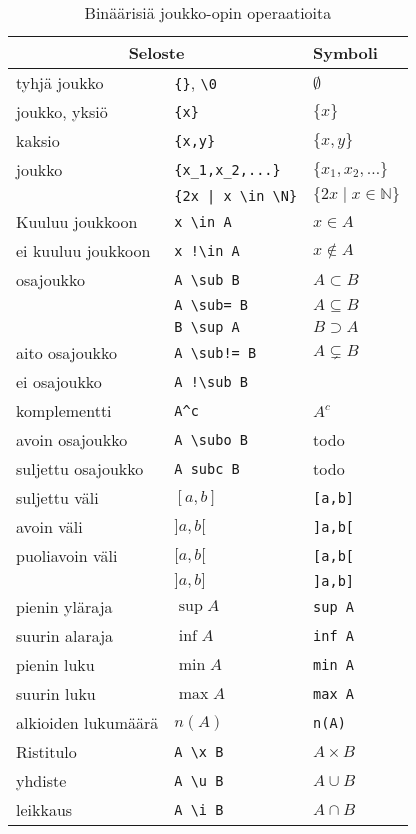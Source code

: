 \begin{table}[ht]
\begin{tabular}{ l|l|l }
\multicolumn{2}{c}{Seloste} & Symboli \\ \hline
tyhjä joukko & \verb${}$, \verb$\0$ & $\emptyset$ \\
joukko, yksiö & \verb${x}$ & $\{x\}$ \\
kaksio & \verb${x,y}$ & $\{x,y\}$ \\
joukko & \verb${x_1,x_2,...}$ & $\{x_1,x_2,\ldots\}$ \\
& \verb${2x | x \in \N}$ & $\{2x \mid x \in \mathbb{N}\}$ \\
Kuuluu joukkoon & \verb$x \in A$ & $x\in A$ \\
ei kuuluu joukkoon & \verb$x !\in A$ & $x\notin A$ \\
osajoukko & \verb$A \sub B$ & $A \subset B$ \\
& \verb$A \sub= B$ & $A \subseteq B$ \\
& \verb$B \sup A$ & $B \supset A$ \\
aito osajoukko & \verb$A \sub!= B$ & $A \subsetneq B$ \\
ei osajoukko & \verb$A !\sub B$ & \\
komplementti & \verb$A^c$ & $A^c$ \\
avoin osajoukko & \verb$A \subo B$ & todo \\
suljettu osajoukko & \verb$A subc B$ & todo \\
suljettu väli & $[a,b]$ & \verb$[a,b]$ \\
avoin väli & $]a,b[$ & \verb$]a,b[$ \\
puoliavoin väli & $[a,b[$ & \verb$[a,b[$ \\
& $]a,b]$ & \verb$]a,b]$ \\
pienin yläraja & $\sup A$ & \verb$sup A$ \\
suurin alaraja & $\inf A$ & \verb$inf A$ \\
pienin luku & $\min A$ & \verb$min A$ \\
suurin luku & $\max A$ & \verb$max A$ \\
alkioiden lukumäärä & $n(A)$ & \verb$n(A)$ \\
Ristitulo & \verb$A \x B$ & $A\times B$ \\
yhdiste & \verb$A \u B$ & $A\cup B$ \\
leikkaus & \verb$A \i B$ & $A\cap B$ \\
\end{tabular}
\caption{Binäärisiä joukko-opin operaatioita}
\label{tbl:setop}
\end{table}


